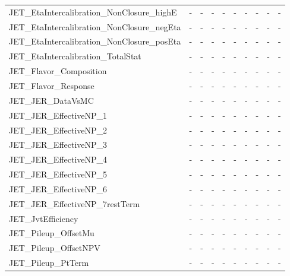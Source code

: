 \begin{table}[htbp]
{\begin{tabular}{l | ccccccccc}
JET\_EtaIntercalibration\_NonClosure\_highE  &    - &    - &    - &    - &    - &    - &    - &    - &    - \\
JET\_EtaIntercalibration\_NonClosure\_negEta &    - &    - &    - &    - &    - &    - &    - &    - &    - \\
JET\_EtaIntercalibration\_NonClosure\_posEta &    - &    - &    - &    - &    - &    - &    - &    - &    - \\
JET\_EtaIntercalibration\_TotalStat         &    - &    - &    - &    - &    - &    - &    - &    - &    - \\
JET\_Flavor\_Composition                    &    - &    - &    - &    - &    - &    - &    - &    - &    - \\
JET\_Flavor\_Response                       &    - &    - &    - &    - &    - &    - &    - &    - &    - \\
JET\_JER\_DataVsMC                          &    - &    - &    - &    - &    - &    - &    - &    - &    - \\
JET\_JER\_EffectiveNP\_1                     &    - &    - &    - &    - &    - &    - &    - &    - &    - \\
JET\_JER\_EffectiveNP\_2                     &    - &    - &    - &    - &    - &    - &    - &    - &    - \\
JET\_JER\_EffectiveNP\_3                     &    - &    - &    - &    - &    - &    - &    - &    - &    - \\
JET\_JER\_EffectiveNP\_4                     &    - &    - &    - &    - &    - &    - &    - &    - &    - \\
JET\_JER\_EffectiveNP\_5                     &    - &    - &    - &    - &    - &    - &    - &    - &    - \\
JET\_JER\_EffectiveNP\_6                     &    - &    - &    - &    - &    - &    - &    - &    - &    - \\
JET\_JER\_EffectiveNP\_7restTerm             &    - &    - &    - &    - &    - &    - &    - &    - &    - \\
JET\_JvtEfficiency                         &    - &    - &    - &    - &    - &    - &    - &    - &    - \\
JET\_Pileup\_OffsetMu                       &    - &    - &    - &    - &    - &    - &    - &    - &    - \\
JET\_Pileup\_OffsetNPV                      &    - &    - &    - &    - &    - &    - &    - &    - &    - \\
JET\_Pileup\_PtTerm                         &    - &    - &    - &    - &    - &    - &    - &    - &    - \\

\end{tabular}}
\end{table}
